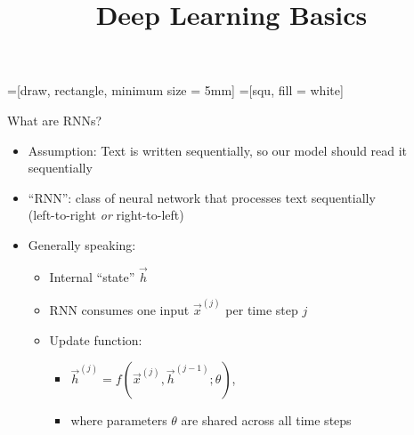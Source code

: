 



=[draw, rectangle, minimum size = 5mm]
=[squ, fill = white]

\newcommand{\titlefigure}{figure/rnn.png}
\newcommand{\learninggoals}{
\item Understand recurent structure of RNNs
\item Learn the different types of RNNs
\item Understand applicability of RNNs}

\title{Deep Learning Basics}
\date{}




\begin{vbframe}{What are RNNs?}

\vfill

\begin{itemize}
	\item Assumption: Text is written sequentially, so our model should read it sequentially
	\item ``RNN'': class of neural network that processes text sequentially\\
				(left-to-right \textit{or} right-to-left)
	\item Generally speaking:
		\begin{itemize}
			\item Internal ``state'' $\vec h$
			\item RNN consumes one input $\vec x^{(j)}$ per time step $j$
			\item Update function:
			\begin{itemize}
				\item $\vec h^{(j)} = f(\vec x^{(j)}, \vec h^{({j-1})}; \theta)$,
				\item where parameters $\theta$ are shared across all time steps
			\end{itemize}
		\end{itemize}
\end{itemize}

\vfill

\end{vbframe}

